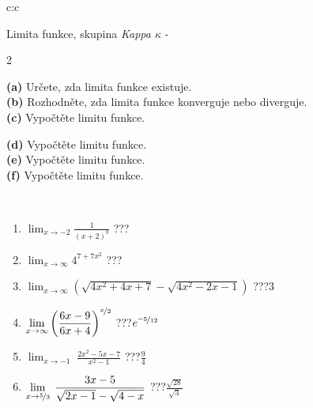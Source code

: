 \documentclass[10pt]{report}
\begin{document}
\begin{tabular}{c:c}
\begin{minipage}[c][104.5mm][t]{0.5\linewidth}
\begin{center}
\vspace{7mm}
{\huge Limita funkce, skupina \textit{Kappa $\kappa$} -}\\[5mm]
\begin{minipage}{0.95\linewidth}
\begin{center}
{\small \begin{multicols}{2} \raggedright
\textbf{(a)} Určete, zda limita funkce existuje. \\[1mm]
\textbf{(b)} Rozhodněte, zda limita funkce konverguje nebo diverguje. \\[1mm]
\textbf{(c)} Vypočtěte limitu funkce. \par \columnbreak
\textbf{(d)} Vypočtěte limitu funkce. \\[1mm]
\textbf{(e)} Vypočtěte limitu funkce. \\[1mm]
\textbf{(f)} Vypočtěte limitu funkce. \\[1mm]
\end{multicols}
}
\end{center}
\end{minipage}
\\[4mm]
\begin{minipage}{0.79\linewidth}
\begin{center}
\begin{varwidth}{\linewidth}
\begin{enumerate}
\normalsize
\item $\displaystyle\lim_{x\to-2}{\frac{1}{(x+2)^{8}}}$\quad \dotfill\; ???\;\dotfill \quad {}
\item $\displaystyle\lim_{x\to\infty}{4^{7+7x^2}}$\quad \dotfill\; ???\;\dotfill \quad {}
\item $\displaystyle\lim_{x\to\infty}{\left(\sqrt{4x^2+4x+7} - \sqrt{4x^2-2x-1}\right)}$\quad \dotfill\; ???\;\dotfill \quad $3$
\item $\displaystyle\lim_{x\to\infty}{\left( \frac{6x-9}{6x+4} \right)^{\nicefrac{x}{2}}}$\quad \dotfill\; ???\;\dotfill \quad $e^{\nicefrac{-5}{12}}$
\item $\displaystyle\lim_{x\to -1}{\;\frac{2x^2-5x-7}{x^2-1}}$\quad \dotfill\; ???\;\dotfill \quad $\frac{9}{4}$
\item $\displaystyle\lim_{x\to \nicefrac{5}{3}}{\;\frac{3x-5}{\sqrt{2x-1} - \sqrt{4-x}}}$\quad \dotfill\; ???\;\dotfill \quad $\frac{\sqrt{28}}{\sqrt{3}}$

\end{enumerate}
\end{varwidth}
\end{center}
\end{minipage}
\end{center}
\end{minipage}
\end{tabular}
\end{document}
